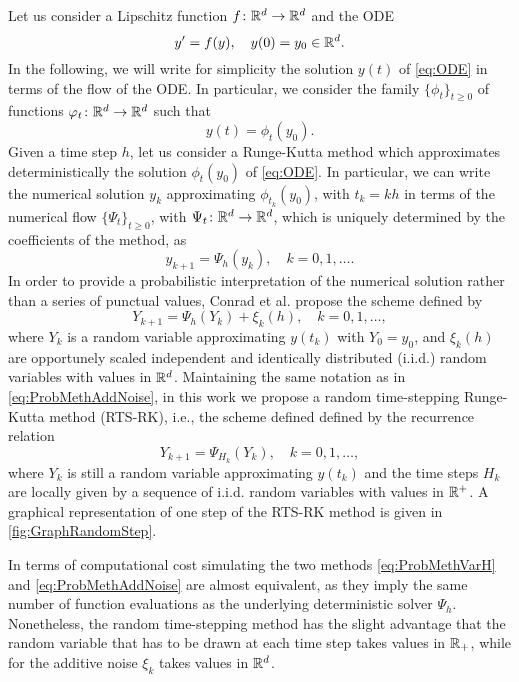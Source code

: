 \documentclass[final,onefignum,onetabnum]{siamonline171218}
\begin{document}
Let us consider a Lipschitz function $f\colon\mathbb{R}^d\to\mathbb{R}^d$ and the ODE
\begin{equation}\label{eq:ODE}
	y' = f(y), \quad y(0) = y_0 \in \R^d.
\end{equation}
In the following, we will write for simplicity the solution $y(t)$ of \eqref{eq:ODE} in terms of the flow of the ODE. In particular, we consider the family  $\{\phi_t\}_{t \geq 0}$ of functions $\varphi_t\colon\mathbb{R}^d\to\mathbb{R}^d$ such that 
\begin{equation}
	y(t) = \phi_t(y_0).
\end{equation}
Given a time step $h$, let us consider a Runge-Kutta method which approximates deterministically the solution $\phi_t(y_0)$ of \eqref{eq:ODE}. In particular, we can write the numerical solution $y_k$ approximating $\phi_{t_k}(y_0)$, with $t_k = kh$ in terms of the numerical flow $\{\Psi_t\}_{t \geq 0}$, with $\Psi_t\colon\mathbb{R}^d\to\mathbb{R}^d$, which is uniquely determined by the coefficients of the method, as
\begin{equation}
	y_{k+1} = \Psi_h(y_k), \quad k = 0, 1, \ldots.
\end{equation}
In order to provide a probabilistic interpretation of the numerical solution rather than a series of punctual values, Conrad et al. propose the scheme defined by
\begin{equation}\label{eq:ProbMethAddNoise}
	Y_{k+1} = \Psi_h(Y_{k}) + \xi_k(h), \quad k = 0, 1, \ldots,
\end{equation}
where $Y_k$ is a random variable approximating $y(t_k)$ with $Y_0 = y_0$, and $\xi_k(h)$ are opportunely scaled independent and identically distributed (i.i.d.) random variables with values in $\mathbb{R}^d$. Maintaining the same notation as in \eqref{eq:ProbMethAddNoise}, in this work we propose a random time-stepping Runge-Kutta method (RTS-RK), i.e., the scheme defined defined by the recurrence relation
\begin{equation}\label{eq:ProbMethVarH}
	Y_{k+1} = \Psi_{H_k}(Y_k), \quad k = 0, 1, \ldots,
\end{equation}
where $Y_k$ is still a random variable approximating $y(t_k)$ and the time steps $H_k$ are locally given by a sequence  of i.i.d. random variables with values in $\mathbb{R}^+$. A graphical representation of one step of the RTS-RK method is given in \cref{fig:GraphRandomStep}.
\begin{remark} In terms of computational cost simulating the two methods \eqref{eq:ProbMethVarH} and \eqref{eq:ProbMethAddNoise} are almost equivalent, as they imply the same number of function evaluations as the underlying deterministic solver $\Psi_h$. Nonetheless, the random time-stepping method has the slight advantage that the random variable that has to be drawn at each time step takes values in $\mathbb{R}_+$, while for the additive noise $\xi_k$ takes values in $\mathbb{R}^d$.
\end{remark}
\end{document}
